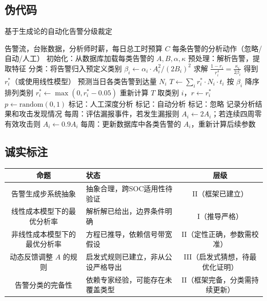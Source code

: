 \documentclass[11pt,a4paper]{article}
\begin{document}
\subsection{伪代码}

\begin{algorithm}[ht]
\caption{基于生成论的自动化告警分级裁定}
\begin{algorithmic}[1]
\Require 告警流，台账数据，分析师时薪，每日总工时预算 $C$
\Ensure 每条告警的分析动作（忽略/自动/人工）
\State 初始化：从数据库加载每类告警的 $A, B, \alpha, \kappa$
\Loop
    \State 预处理：解析告警，提取特征
    \State 分类：将告警归入预定义类别
        \State $\beta_i \gets \alpha_i \cdot A_i^2 / (2B_i)^2$
        \State 求解 $\frac{1 - r_i}{r_i^4} = \frac{\kappa_i}{2\beta_i}$ 得到 $r_i^*$（或使用线性模型）
    \EndFor
    \State 预测当日各类告警到达量 $N_i$
    \State $T \gets \sum_i r_i^* \cdot N_i \cdot t_i$
        \State 按 $\beta_i$ 降序排列类别
                \State $r_i^* \gets \max(0, r_i^* - 0.05)$
                \State 重新计算 $T$
            \EndWhile
        \EndFor
    \EndIf
        \State 取类别 $i$，$r \gets r_i^*$
        \State $p \gets \text{random}(0,1)$
                \State 标记：人工深度分析
            \Else
                \State 标记：自动分析
            \EndIf
        \Else
            \State 标记：忽略
        \EndIf
    \EndFor
    \State 记录分析结果和攻击发现情况
\EndLoop
\State 每周：评估漏报事件，若发生漏报则 $A_i \gets 2A_i$；若连续四周零有效攻击则 $A_i \gets 0.9A_i$
\State 每周：更新数据库中各类告警的 $A_i$，重新计算后续参数
\end{algorithmic}
\end{algorithm}

\subsection{诚实标注}

\begin{center}
\begin{xltabular}{\textwidth}{c|X|c}
\toprule
\textbf{命题} & \textbf{状态} & \textbf{层级} \\
\midrule
告警生成步系统抽象 &
抽象合理，跨SOC适用性待验证 &
II（框架已建立） \\
线性成本模型下的最优分析率 &
解析解已给出，边界条件明确 &
I（推导严格） \\
非线性成本模型下的最优分析率 &
方程已推导，依赖信号带宽假设 &
II（定性正确，参数需校准） \\
动态反馈调整 $A$ 的规则 &
启发式规则已建立，非从公设严格导出 &
III（启发式猜想，待最优化证明） \\
告警分类的完备性 &
依赖专家经验，可能存在未覆盖类型 &
II（框架完备，分类需持续更新） \\
\bottomrule
\end{xltabular}
\end{center}
\end{document}
